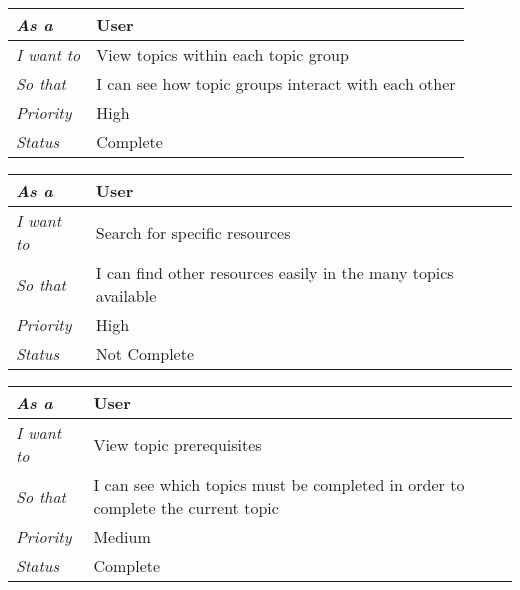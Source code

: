 \begin{table}[hp]
\begin{tabular}{ll}
\textit{As a}      & User                                                \\ \hline
\textit{I want to} & View topics within each topic group                 \\ \hline
\textit{So that}   & I can see how topic groups interact with each other \\ \hline
\textit{Priority}  & {\color[HTML]{FE0000} High}                         \\ \hline
\textit{Status}    & Complete                                            \\ \hline
\end{tabular}
\end{table}

\begin{table}[hp]
\begin{tabular}{ll}
\textit{As a}      & User                                                           \\ \hline
\textit{I want to} & Search for specific resources                                  \\ \hline
\textit{So that}   & I can find other resources easily in the many topics available \\ \hline
\textit{Priority}  & {\color[HTML]{FE0000} High}                                    \\ \hline
\textit{Status}    & Not Complete                                                   \\ \hline          
\end{tabular}
\end{table}

\begin{table}[hp]
\begin{tabular}{ll}
\textit{As a}      & User                                                                            \\ \hline
\textit{I want to} & View topic prerequisites                                                        \\ \hline
\textit{So that}   & I can see which topics must be completed in order to complete the current topic \\ \hline
\textit{Priority}  & {\color[HTML]{FE996B} Medium}                                                     \\ \hline
\textit{Status}    & Complete                                                                        \\ \hline                              
\end{tabular}
\end{table}

